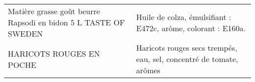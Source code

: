 \begin{longtable}{p{5cm}p{10cm}}
                                          Matière grasse goût beurre Rapsodi en bidon 5 L TASTE OF SWEDEN &                                                                                                                                                                                                                                                                                                                                                                                                                                                                                                                                                                                                                                                                                                                                                                                                                                                                                                                                                                            Huile de colza, émulsifiant : E472c, arôme, colorant : E160a. \\
                                                                                HARICOTS ROUGES EN POCHE  &                                                                                                                                                                                                                                                                                                                                                                                                                                                                                                                                                                                                                                                                                                                                                                                                                                                                                                                                                                      Haricots rouges secs trempés, eau, sel, concentré de tomate, arômes \\

\end{longtable}
